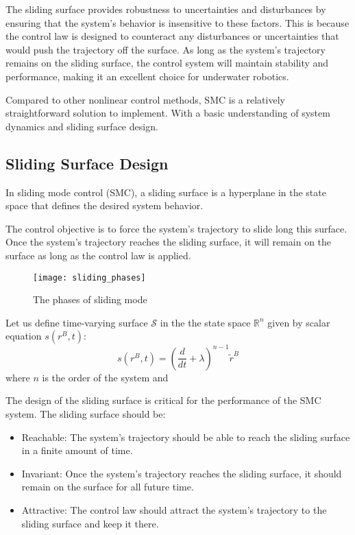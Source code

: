 The sliding surface provides robustness to uncertainties and
disturbances by ensuring that the system's behavior is insensitive
to these factors. This is because the control law is designed to counteract any
disturbances or uncertainties that would push the trajectory off
the surface. As long as the system's trajectory remains on the
sliding surface, the control system will maintain stability and
performance, making it an excellent choice for underwater
robotics.

Compared to other nonlinear control methods, SMC is a relatively straightforward
solution to implement. With a basic understanding of system dynamics and sliding
surface design.

\subsection{Sliding Surface Design}
In sliding mode control (SMC), a sliding surface is a hyperplane in
the state space that defines the desired system behavior.

The control objective is to force the system's trajectory to slide
long this surface. Once the system's trajectory reaches the sliding surface,
it will remain on the surface as long as the control law is applied.

\begin{figure}[H]
    \centering\texttt{[image: sliding\_phases]}
    \caption{The phases of sliding mode}
    \label{image:sliding_phases}
\end{figure}

Let us define time-varying surface $\mathcal{S}$ in the the state space $\mathbb{R}^n$
given by scalar equation $s(r^B, t)$:
$$
    s(r^B, t) = (\frac{d}{dt} + \lambda)^{n-1}\tilde r^B
$$
where $n$ is the order of the system and 


The design of the sliding surface is critical for the performance of the SMC
system. The sliding surface should be:
\begin{itemize}
    \item Reachable: The system's trajectory should be able to reach the sliding
          surface in a finite amount of time.
    \item Invariant: Once the system's trajectory reaches the sliding surface, it
          should remain on the surface for all future time.
    \item Attractive: The control law should attract the system's trajectory to the
          sliding surface and keep it there.
\end{itemize}


